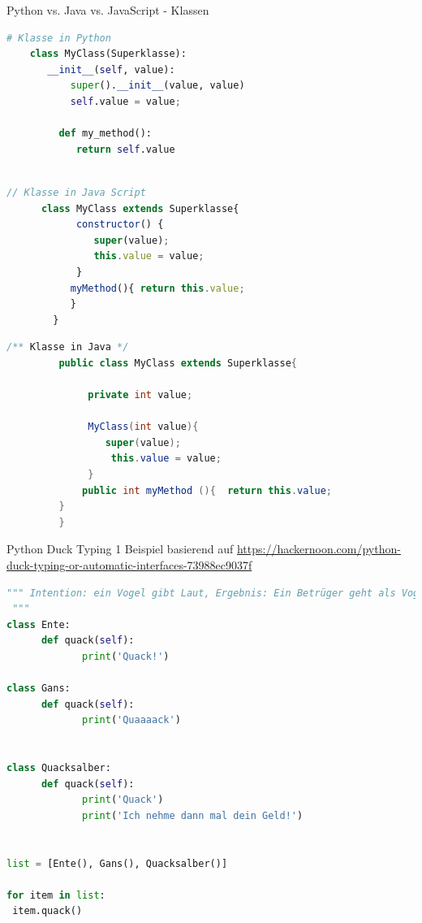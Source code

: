 \begin{frame}[fragile]{Python vs. Java vs. JavaScript - Klassen}
\begin{lstlisting}[language=Python]
	# Klasse in Python
 	class MyClass(Superklasse): 
	   __init__(self, value):
	       super().__init__(value, value)
	       self.value = value;
	       
	     def my_method():
	        return self.value
	  
	\end{lstlisting}
\begin{lstlisting}[language=JavaScript]
       // Klasse in Java Script
 	  class MyClass extends Superklasse{
	        constructor() {
	           super(value);
	           this.value = value; 
	        }
	       myMethod(){ return this.value;
	       }
	    }
\end{lstlisting}
\begin{lstlisting}[language=Java]
       /** Klasse in Java */
         public class MyClass extends Superklasse{
 
              private int value;
              
              MyClass(int value){
              	 super(value);
                  this.value = value;
              }
      	     public int myMethod (){  return this.value;
	     }
         }
\end{lstlisting}
\end{frame}


\begin{frame}[fragile]{Python Duck Typing 1}
Beispiel basierend auf \url{https://hackernoon.com/python-duck-typing-or-automatic-interfaces-73988ec9037f}
\begin{lstlisting}[language=Python]
 """ Intention: ein Vogel gibt Laut, Ergebnis: Ein Betrüger geht als Vogel durch, denn er kann ja quack machen und nimmt das Geld mit.
 """
class Ente:
	  def quack(self):
             print('Quack!')
             
class Gans:
	  def quack(self):
             print('Quaaaack')
             

class Quacksalber:
      def quack(self):
             print('Quack')
             print('Ich nehme dann mal dein Geld!')


list = [Ente(), Gans(), Quacksalber()]
        
for item in list:
 item.quack()  

	\end{lstlisting}
\end{frame}

